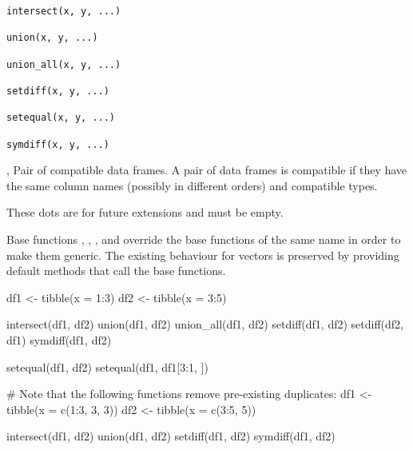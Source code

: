 \documentclass[a4paper]{book}
\begin{document}
%
\begin{Usage}
\begin{verbatim}
intersect(x, y, ...)

union(x, y, ...)

union_all(x, y, ...)

setdiff(x, y, ...)

setequal(x, y, ...)

symdiff(x, y, ...)
\end{verbatim}
\end{Usage}
%
\begin{Arguments}
\begin{ldescription}
\item[\code{x}, \code{y}] Pair of compatible data frames. A pair of data frames is
compatible if they have the same column names (possibly in different
orders) and compatible types.

\item[\code{...}] These dots are for future extensions and must be empty.
\end{ldescription}
\end{Arguments}
%
\begin{Section}{Base functions}
, , , and  override the base
functions of the same name in order to make them generic. The existing
behaviour for vectors is preserved by providing default methods that call
the base functions.
\end{Section}
%
\begin{Examples}
\begin{ExampleCode}
df1 <- tibble(x = 1:3)
df2 <- tibble(x = 3:5)

intersect(df1, df2)
union(df1, df2)
union_all(df1, df2)
setdiff(df1, df2)
setdiff(df2, df1)
symdiff(df1, df2)

setequal(df1, df2)
setequal(df1, df1[3:1, ])

# Note that the following functions remove pre-existing duplicates:
df1 <- tibble(x = c(1:3, 3, 3))
df2 <- tibble(x = c(3:5, 5))

intersect(df1, df2)
union(df1, df2)
setdiff(df1, df2)
symdiff(df1, df2)
\end{ExampleCode}
\end{Examples}
\end{document}
